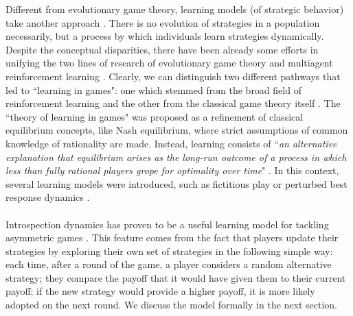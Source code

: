 \documentclass[11pt]{article}
\theoremstyle{plainCl1}
\theoremstyle{plainCl2}
\begin{document}

\noindent Different from evolutionary game theory, learning models (of strategic behavior) take another approach \cite{Sandholm:BioSys:1996, Fudenberg:book:1998b, Macy:PNAS:2002, Hofbauer:GEB:2005, Tuyls:bookchapter:2005, Galla:PNAS:2013, Barfuss:PRE:2019, Barfuss:PNAS:2020, Pangallo:GEB:2022}. There is no evolution of strategies in a population necessarily, but a process by which individuals learn strategies dynamically. 
Despite the conceptual disparities, there have been already some efforts in unifying the two lines of research of evolutionary game theory and multiagent reinforcement learning \cite{Macy:PNAS:2002, Tuyls:bookchapter:2005, Bloembergen:JAIR:2015, Zhang:arxiv:2022}. 
\noindent Clearly, we can distinguish two different pathways that led to ``learning in games": one which stemmed from the broad field of reinforcement learning \cite{Sandholm:BioSys:1996} and the other from the classical game theory itself \cite{Fudenberg:book:1998b}. The ``theory of learning in games" was proposed as a refinement of classical equilibrium concepts, like Nash equilibrium, where strict assumptions of common knowledge of rationality are made. Instead, learning consists of ``\textit{an alternative explanation that equilibrium arises as the long-run outcome of a process in which less than fully rational players grope for optimality over time}" \cite{Fudenberg:book:1998b}. In this context, several learning models were introduced, such as fictitious play \cite{Gaunersdorfer:GEB:1995} or perturbed best response dynamics \cite{Hofbauer:GEB:2005}.
\\  \\
\noindent Introspection dynamics has proven to be a useful learning model for tackling asymmetric games \cite{Couto:NJP:2022, Hauser:Nature:2019, McAvoy:PNASnexus:2022, Schmid:PlosCB:2022}. 
This feature comes from the fact that players update their strategies by exploring their own set of strategies in the following simple way: each time, after a round of the game, a player considers a random alternative strategy; they compare the payoff that it would have given them to their current payoff; if the new strategy would provide a higher payoff, it is more likely adopted on the next round. We discuss the model formally in the next section. 
\end{document}
